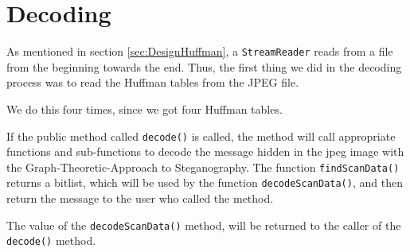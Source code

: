 \section{Decoding}
As mentioned in section \ref{sec:DesignHuffman}, a \lstinline|StreamReader| reads from a file from the beginning towards the end.
Thus, the first thing we did in the decoding process was to read the Huffman tables from the JPEG file. 

We do this four times, since we got four Huffman tables.

If the public method called \lstinline|decode()| is called, the method will call appropriate functions and sub-functions to decode the message hidden in the jpeg image with the Graph-Theoretic-Approach to Steganography.
The function \lstinline|findScanData()| returns a bitlist, which will be used by the function \lstinline|decodeScanData()|, and then return the message to the user who called the method.


The value of the \lstinline|decodeScanData()| method, will be returned to the caller of the \lstinline|decode()| method.

